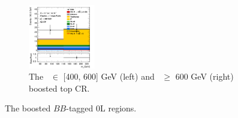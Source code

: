 \begin{figure}[h!]
\begin{subfigure}[b]{\textwidth}
        \includegraphics[width=0.32\textwidth]{Images/VH/Own_fit/prefit_VHbb/Region_distmBB_BMin600_incFat1_Fat1_DSRtopaddbjetcr_J0_TTypebb_incJet1_T2_L0_Y6051_Prefit.png}
        \caption{The \ptv\ $\in$ [400, 600] GeV (left) and \ptv\ $\geq$ 600 GeV (right) boosted top CR.}
        \label{fig:plots_VHbbBoost_OL_topCR}
    \end{subfigure}
    \caption{The boosted $BB$-tagged 0L regions.}
    \label{fig:plots_VHbbBoost_OL}
\end{figure} 



